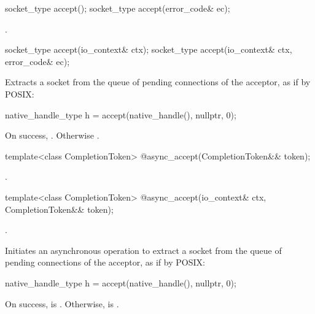 \begin{itemdecl}
socket_type accept();
socket_type accept(error_code& ec);
\end{itemdecl}

\begin{itemdescr}
\pnum
\returns {}.
\end{itemdescr}

\begin{itemdecl}
socket_type accept(io_context& ctx);
socket_type accept(io_context& ctx, error_code& ec);
\end{itemdecl}

\begin{itemdescr}
\pnum
\effects Extracts a socket from the queue of pending connections of the acceptor, as if by POSIX: 
\begin{codeblock}
native_handle_type h = accept(native_handle(), nullptr, 0);
\end{codeblock}


\pnum
\returns On success, . Otherwise .
\end{itemdescr}

\begin{itemdecl}
template<class CompletionToken>
  @\DEDUCED@ async_accept(CompletionToken&& token);
\end{itemdecl}

\begin{itemdescr}
\pnum
\returns {}.
\end{itemdescr}

\begin{itemdecl}
template<class CompletionToken>
  @\DEDUCED@ async_accept(io_context& ctx, CompletionToken&& token);
\end{itemdecl}

\begin{itemdescr}
\pnum
\completionsig {}.

\pnum
\effects Initiates an asynchronous operation to extract a socket from the queue of pending connections of the acceptor, as if by POSIX: 
\begin{codeblock}
native_handle_type h = accept(native_handle(), nullptr, 0);
\end{codeblock}
 On success,  is . Otherwise,  is .
\end{itemdescr}

